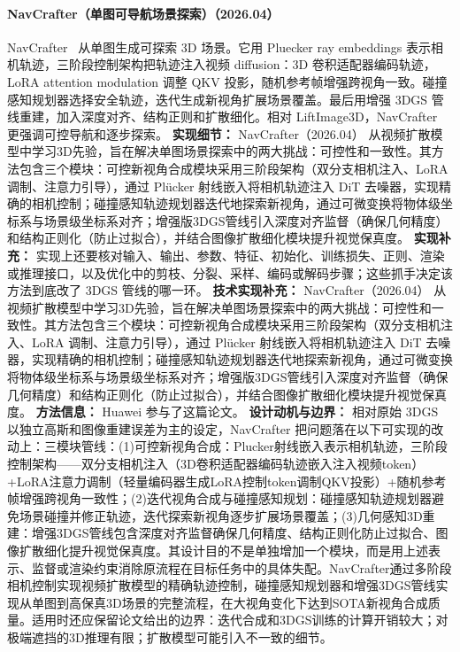 \paragraph{NavCrafter（单图可导航场景探索）（2026.04）}
NavCrafter~\cite{2604_02828} 从单图生成可探索 3D 场景。它用 Pluecker ray embeddings 表示相机轨迹，三阶段控制架构把轨迹注入视频 diffusion：3D 卷积适配器编码轨迹，LoRA attention modulation 调整 QKV 投影，随机参考帧增强跨视角一致。碰撞感知规划器选择安全轨迹，迭代生成新视角扩展场景覆盖。最后用增强 3DGS 管线重建，加入深度对齐、结构正则和扩散细化。相对 LiftImage3D，NavCrafter 更强调可控导航和逐步探索。
\textbf{实现细节：} NavCrafter（2026.04） 从视频扩散模型中学习3D先验，旨在解决单图场景探索中的两大挑战：可控性和一致性。其方法包含三个模块：可控新视角合成模块采用三阶段架构（双分支相机注入、LoRA 调制、注意力引导），通过 Pl\"{u}cker 射线嵌入将相机轨迹注入 DiT 去噪器，实现精确的相机控制；碰撞感知轨迹规划器迭代地探索新视角，通过可微变换将物体级坐标系与场景级坐标系对齐；增强版3DGS管线引入深度对齐监督（确保几何精度）和结构正则化（防止过拟合），并结合图像扩散细化模块提升视觉保真度。
\textbf{实现补充：} 实现上还要核对输入、输出、参数、特征、初始化、训练损失、正则、渲染或推理接口，以及优化中的剪枝、分裂、采样、编码或解码步骤；这些抓手决定该方法到底改了 3DGS 管线的哪一环。
\textbf{技术实现补充：} NavCrafter（2026.04） 从视频扩散模型中学习3D先验，旨在解决单图场景探索中的两大挑战：可控性和一致性。其方法包含三个模块：可控新视角合成模块采用三阶段架构（双分支相机注入、LoRA 调制、注意力引导），通过 Pl\"{u}cker 射线嵌入将相机轨迹注入 DiT 去噪器，实现精确的相机控制；碰撞感知轨迹规划器迭代地探索新视角，通过可微变换将物体级坐标系与场景级坐标系对齐；增强版3DGS管线引入深度对齐监督（确保几何精度）和结构正则化（防止过拟合），并结合图像扩散细化模块提升视觉保真度。
\textbf{方法信息：} Huawei 参与了这篇论文。
\textbf{设计动机与边界：} 相对原始 3DGS 以独立高斯和图像重建误差为主的设定，NavCrafter 把问题落在以下可实现的改动上：三模块管线：(1)可控新视角合成：Plucker射线嵌入表示相机轨迹，三阶段控制架构——双分支相机注入（3D卷积适配器编码轨迹嵌入注入视频token）+LoRA注意力调制（轻量编码器生成LoRA控制token调制QKV投影）+随机参考帧增强跨视角一致性；(2)迭代视角合成与碰撞感知规划：碰撞感知轨迹规划器避免场景碰撞并修正轨迹，迭代探索新视角逐步扩展场景覆盖；(3)几何感知3D重建：增强3DGS管线包含深度对齐监督确保几何精度、结构正则化防止过拟合、图像扩散细化提升视觉保真度。其设计目的不是单独增加一个模块，而是用上述表示、监督或渲染约束消除原流程在目标任务中的具体失配。NavCrafter通过多阶段相机控制实现视频扩散模型的精确轨迹控制，碰撞感知规划器和增强3DGS管线实现从单图到高保真3D场景的完整流程，在大视角变化下达到SOTA新视角合成质量。适用时还应保留论文给出的边界：迭代合成和3DGS训练的计算开销较大；对极端遮挡的3D推理有限；扩散模型可能引入不一致的细节。

